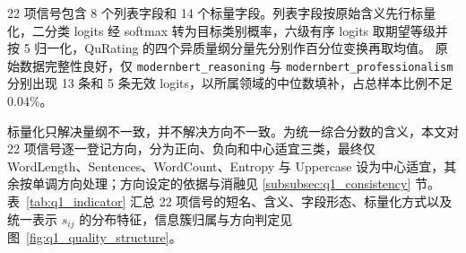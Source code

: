 \documentclass[bwprint]{gmcmthesis}
\begin{document}
22 项信号包含 8 个列表字段和 14 个标量字段。列表字段按原始含义先行标量化，二分类 logits 经 softmax 转为目标类别概率，六级有序 logits 取期望等级并按 5 归一化，QuRating 的四个异质量纲分量先分别作百分位变换再取均值。
原始数据完整性良好，仅 \texttt{modernbert\_reasoning} 与 \texttt{modernbert\_professionalism} 分别出现 13 条和 5 条无效 logits，以所属领域的中位数填补，占总样本比例不足 $0.04\%$。

标量化只解决量纲不一致，并不解决方向不一致。为统一综合分数的含义，本文对 22 项信号逐一登记方向，分为正向、负向和中心适宜三类，最终仅 WordLength、Sentences、WordCount、Entropy 与 Uppercase 设为中心适宜，其余按单调方向处理；方向设定的依据与消融见 \ref{subsubsec:q1_consistency} 节。
表~\ref{tab:q1_indicator} 汇总 22 项信号的短名、含义、字段形态、标量化方式以及统一表示 $s_{ij}$ 的分布特征，信息簇归属与方向判定见图~\ref{fig:q1_quality_structure}。
\end{document}
